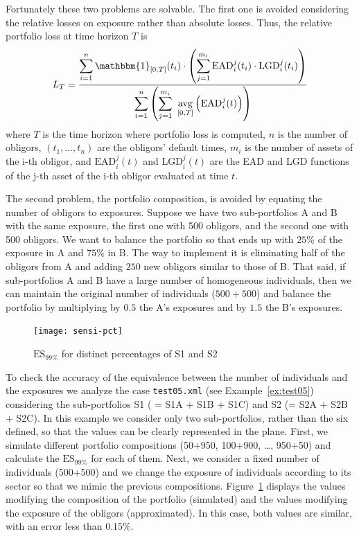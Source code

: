 \documentclass[11pt,fleqn]{book} %
\begin{document}
Fortunately these two problems are solvable. The first one is avoided
considering the relative losses on exposure rather than absolute losses. 
Thus, the relative portfolio loss at time horizon $T$ is
\begin{displaymath}
	L_T = \frac{
	\displaystyle \sum_{i=1}^n \mathbbm{1}_{[0,T]}(t_i) \cdot 
	\left( 
	\sum_{j=1}^{m_i} \text{EAD}_i^j(t_i) \cdot \text{LGD}_i^j(t_i)
	\right)}
	{\displaystyle \sum_{i=1}^n
	\left( 
	\sum_{j=1}^{m_i}\ \underset{[0,T]}{\text{avg}} \left( \text{EAD}_i^j(t) \right)
	\right)}
\end{displaymath}
where $T$ is the time horizon where portfolio loss is computed, $n$ is the 
number of obligors, $(t_1,\dots,t_n)$ are the obligors' default times, $m_i$ 
is the number of assets of the i-th obligor, and $\text{EAD}_i^j(t)$ and 
$\text{LGD}_i^j(t)$ are the EAD and LGD functions of the j-th asset of the 
i-th obligor evaluated at time $t$.

The second problem, the portfolio composition, is avoided by equating the number 
of obligors to exposures. Suppose we have two sub-portfolios A and B with the 
same exposure, the first one with 500 obligors, and the second one with 500 
obligors. We want to balance the portfolio so that ends up with $25\%$ of the 
exposure in A and $75\%$ in B. The way to implement it is eliminating 
half of the obligors from A and adding $250$ new obligors similar to those of 
B. That said, if sub-portfolios A and B have a large number of homogeneous 
individuals, then we can maintain the original number of individuals 
($500+500$) and balance the portfolio by multiplying by $0.5$ the A's exposures 
and by $1.5$ the B's exposures.

\begin{figure}[!ht]
	\centering
	\texttt{[image: sensi-pct]}
	\caption{$\text{ES}_{99\%}$ for distinct percentages of S1 and S2}
	\label{fig:popt2}
\end{figure}

\begin{example}
	To check the accuracy of the equivalence between the number of individuals 
	and the exposures we analyze the case \texttt{test05.xml} (see 
	Example~\ref{ex:test05}) considering the sub-portfolios S1 ( = S1A + 
	S1B + S1C) and S2 (= S2A + S2B + S2C). In this example we consider only two 
	sub-portfolios, rather than the six defined, so that the values can be 
	clearly represented in the plane. First, we simulate different portfolio 
	compositions (50+950, 100+900, \dots, 950+50) and calculate the 
	$\text{ES}_{99\%}$ for each of them. Next, we consider a fixed number of 
	individuals (500+500) and we change the exposure of individuals according to 
	its sector so that we mimic the previous compositions. Figure~\ref{fig:popt2} 
	displays the values modifying the composition of the portfolio (simulated) 
	and the values modifying the exposure of the obligors (approximated). In this 
	case, both values are similar, with an error less than $0.15\%$.
\end{example}
\end{document}
